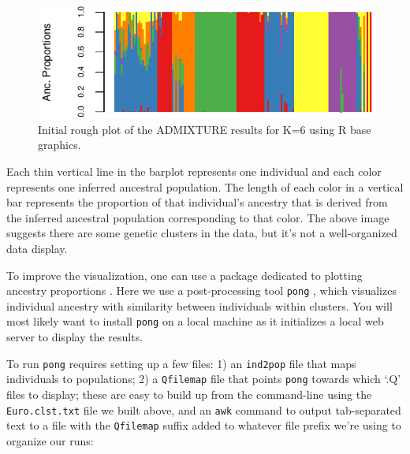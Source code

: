 \documentclass{svmult}       %
\newenvironment{Shaded}{\begin{snugshade}}{\end{snugshade}}
\newcommand{\StringTok}[1]{\textcolor[rgb]{0.31,0.60,0.02}{#1}}
\newcommand{\FunctionTok}[1]{\textcolor[rgb]{0.00,0.00,0.00}{#1}}
\newcommand{\VariableTok}[1]{\textcolor[rgb]{0.00,0.00,0.00}{#1}}
\newcommand{\OperatorTok}[1]{\textcolor[rgb]{0.81,0.36,0.00}{\textbf{#1}}}
\newcommand{\NormalTok}[1]{#1}
\begin{document}
\begin{figure}
\centering
\includegraphics{Figures/Figure1.pdf}
\caption{\label{fig:Fig1}
    Initial rough plot of the ADMIXTURE results for K=6 using R base graphics.}
\end{figure}

Each thin vertical line in the barplot represents one individual and
each color represents one inferred ancestral population. The length of
each color in a vertical bar represents the proportion of that
individual's ancestry that is derived from the inferred ancestral
population corresponding to that color. The above image suggests there
are some genetic clusters in the data, but it's not a well-organized
data display.

To improve the visualization, one can use a package dedicated to
plotting ancestry proportions \cite{Rosenberg04,Kopelman15,Behr16}. Here we use a post-processing tool
\texttt{pong} \cite{Behr16}, which visualizes individual ancestry
with similarity between individuals within clusters. You will most
likely want to install \texttt{pong} on a local machine as it
initializes a local web server to display the results.

To run \texttt{pong} requires setting up a few files: 1) an
\texttt{ind2pop} file that maps individuals to populations; 2) a
\texttt{Qfilemap} file that points \texttt{pong} towards which `.Q'
files to display; these are easy to build up from the command-line using
the \texttt{Euro.clst.txt} file we built above, and an \texttt{awk}
command to output tab-separated text to a file with the
\texttt{Qfilemap} suffix added to whatever file prefix we're using to
organize our runs:

\begin{Shaded}
\end{Shaded}
\end{document}
